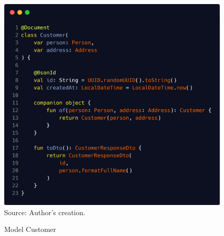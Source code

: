 \begin{figure}[HContext]
	\centering
	\caption{Model Customer}
	\includegraphics[width=1\linewidthContext]{figures/customer}
	\label{fig:customer}
	\footnotesize Source: Author's creation.
\end{figure}

